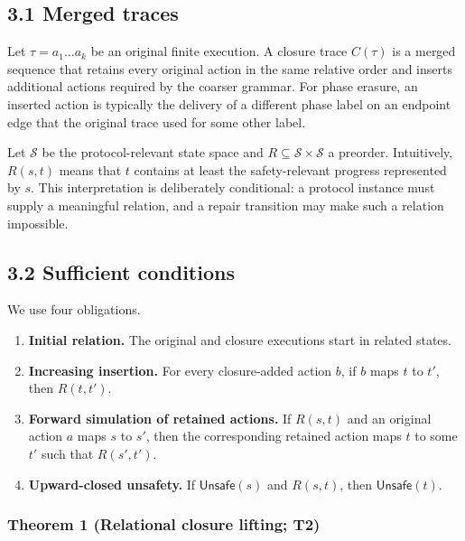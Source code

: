 \documentclass[10pt,a4paper]{article}
\newcommand{\tightlist}{\setlength{\itemsep}{0pt}\setlength{\parskip}{0pt}}
\begin{document}
\subsection{3.1 Merged traces}\label{merged-traces}

Let \(\tau=a_1\ldots a_k\) be an original finite execution. A closure
trace \(C(\tau)\) is a merged sequence that retains every original
action in the same relative order and inserts additional actions
required by the coarser grammar. For phase erasure, an inserted action
is typically the delivery of a different phase label on an endpoint edge
that the original trace used for some other label.

Let \(\mathcal{S}\) be the protocol-relevant state space and
\(R\subseteq\mathcal{S}\times\mathcal{S}\) a preorder. Intuitively,
\(R(s,t)\) means that \(t\) contains at least the safety-relevant
progress represented by \(s\). This interpretation is deliberately
conditional: a protocol instance must supply a meaningful relation, and
a repair transition may make such a relation impossible.

\subsection{3.2 Sufficient conditions}\label{sufficient-conditions}

We use four obligations.

\begin{enumerate}
\def\labelenumi{\arabic{enumi}.}
\tightlist
\item
  \textbf{Initial relation.} The original and closure executions start
  in related states.
\item
  \textbf{Increasing insertion.} For every closure-added action \(b\),
  if \(b\) maps \(t\) to \(t'\), then \(R(t,t')\).
\item
  \textbf{Forward simulation of retained actions.} If \(R(s,t)\) and an
  original action \(a\) maps \(s\) to \(s'\), then the corresponding
  retained action maps \(t\) to some \(t'\) such that \(R(s',t')\).
\item
  \textbf{Upward-closed unsafety.} If \(\mathsf{Unsafe}(s)\) and
  \(R(s,t)\), then \(\mathsf{Unsafe}(t)\).
\end{enumerate}

\subsubsection{Theorem 1 (Relational closure lifting;
T2)}\label{theorem-1-relational-closure-lifting-t2}
\end{document}
